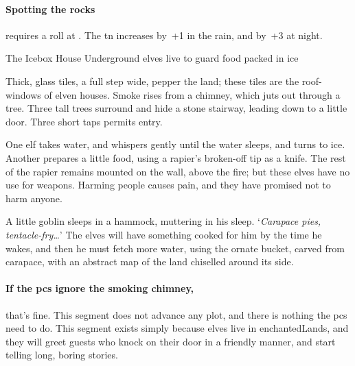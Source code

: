 \begin{multicols}{2}
\paragraph{Spotting the rocks}
requires a  roll at \tn[12].
The \gls{tn} increases by~+1 in the rain, and by~+3 at night.

{The Icebox House}%
{Underground elves live to guard food packed in ice}%
\label{iceboxHouse}


Thick, glass tiles, a full step wide, pepper the land; these tiles are the roof-windows of elven houses.%
Smoke rises from a chimney, which juts out through a tree.
Three tall trees surround and hide a stone stairway, leading down to a little door.
Three short taps permits entry.

\begin{boxtext}
  One elf takes water, and whispers gently until the water sleeps, and turns to ice.
  Another prepares a little food, using a rapier's broken-off tip as a knife.
  The rest of the rapier remains mounted on the wall, above the fire; but these elves have no use for weapons.
  Harming people causes pain, and they have promised not to harm anyone.
\end{boxtext}

A little goblin sleeps in a hammock, muttering in his sleep.
`\textit{Carapace pies, tentacle-fry\ldots}'
The elves will have something cooked for him by the time he wakes, and then he must fetch more water, using the ornate bucket, carved from carapace, with an abstract map of the land chiselled around its side.

\elf

\paragraph{If the \glspl{pc} ignore the smoking chimney,}
that's fine.
This \gls{segment} does not advance any plot, and there is nothing the \glspl{pc} need to do.
This \gls{segment} exists simply because elves live in \gls{enchantedLands}, and they will greet guests who knock on their door in a friendly manner, and start telling long, boring stories.


\end{multicols}
